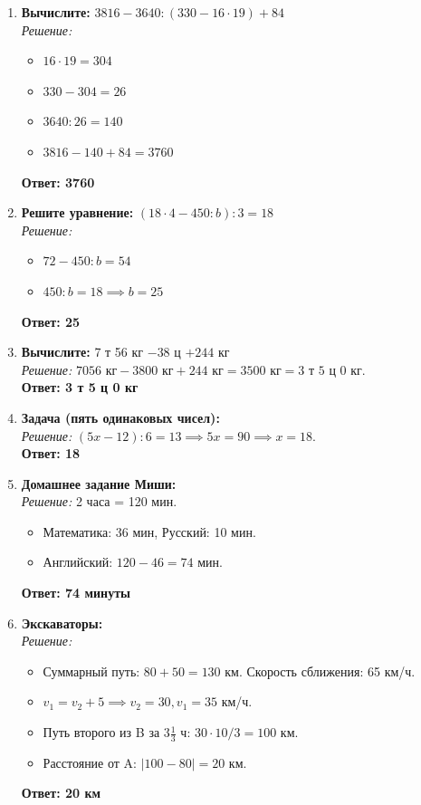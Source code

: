 \begin{enumerate}
    \item \textbf{Вычислите:} $3816 - 3640 : (330 - 16 \cdot 19) + 84$ \\
    \textit{Решение:}
    \begin{itemize}
        \item $16 \cdot 19 = 304$
        \item $330 - 304 = 26$
        \item $3640 : 26 = 140$
        \item $3816 - 140 + 84 = 3760$
    \end{itemize}
    \textbf{Ответ: 3760}

    \item \textbf{Решите уравнение:} $(18 \cdot 4 - 450 : b) : 3 = 18$ \\
    \textit{Решение:}
    \begin{itemize}
        \item $72 - 450 : b = 54$
        \item $450 : b = 18 \implies b = 25$
    \end{itemize}
    \textbf{Ответ: 25}

    \item \textbf{Вычислите:} 7 т 56 кг $- 38$ ц $+ 244$ кг \\
    \textit{Решение:} $7056 \text{ кг} - 3800 \text{ кг} + 244 \text{ кг} = 3500 \text{ кг} = 3 \text{ т } 5 \text{ ц } 0 \text{ кг}$. \\
    \textbf{Ответ: 3 т 5 ц 0 кг}

    \item \textbf{Задача (пять одинаковых чисел):} \\
    \textit{Решение:} $(5x - 12) : 6 = 13 \implies 5x = 90 \implies x = 18$. \\
    \textbf{Ответ: 18}

    \item \textbf{Домашнее задание Миши:} \\
    \textit{Решение:} 2 часа = 120 мин.
    \begin{itemize}
        \item Математика: 36 мин, Русский: 10 мин.
        \item Английский: $120 - 46 = 74$ мин.
    \end{itemize}
    \textbf{Ответ: 74 минуты}

    \item \textbf{Экскаваторы:} \\
    \textit{Решение:}
    \begin{itemize}
        \item Суммарный путь: $80 + 50 = 130$ км. Скорость сближения: 65 км/ч.
        \item $v_1 = v_2 + 5 \implies v_2 = 30, v_1 = 35$ км/ч.
        \item Путь второго из B за $3\frac{1}{3}$ ч: $30 \cdot 10/3 = 100$ км.
        \item Расстояние от A: $|100 - 80| = 20$ км.
    \end{itemize}
    \textbf{Ответ: 20 км}


\end{enumerate}
